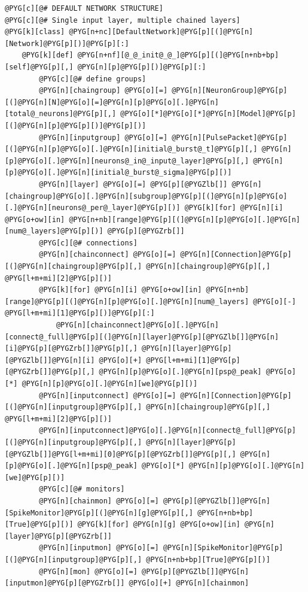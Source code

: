 \documentclass[letterpaper,10pt,english]{manual}
\begin{document}
\begin{Verbatim}[commandchars=@\[\]]
@PYG[c][@# DEFAULT NETWORK STRUCTURE]
@PYG[c][@# Single input layer, multiple chained layers]
@PYG[k][class] @PYG[n+nc][DefaultNetwork]@PYG[p][(]@PYG[n][Network]@PYG[p][)]@PYG[p][:]
    @PYG[k][def] @PYG[n+nf][@_@_init@_@_]@PYG[p][(]@PYG[n+nb+bp][self]@PYG[p][,] @PYG[n][p]@PYG[p][)]@PYG[p][:]
        @PYG[c][@# define groups]
        @PYG[n][chaingroup] @PYG[o][=] @PYG[n][NeuronGroup]@PYG[p][(]@PYG[n][N]@PYG[o][=]@PYG[n][p]@PYG[o][.]@PYG[n][total@_neurons]@PYG[p][,] @PYG[o][*]@PYG[o][*]@PYG[n][Model]@PYG[p][(]@PYG[n][p]@PYG[p][)]@PYG[p][)]
        @PYG[n][inputgroup] @PYG[o][=] @PYG[n][PulsePacket]@PYG[p][(]@PYG[n][p]@PYG[o][.]@PYG[n][initial@_burst@_t]@PYG[p][,] @PYG[n][p]@PYG[o][.]@PYG[n][neurons@_in@_input@_layer]@PYG[p][,] @PYG[n][p]@PYG[o][.]@PYG[n][initial@_burst@_sigma]@PYG[p][)]
        @PYG[n][layer] @PYG[o][=] @PYG[p][@PYGZlb[]] @PYG[n][chaingroup]@PYG[o][.]@PYG[n][subgroup]@PYG[p][(]@PYG[n][p]@PYG[o][.]@PYG[n][neurons@_per@_layer]@PYG[p][)] @PYG[k][for] @PYG[n][i] @PYG[o+ow][in] @PYG[n+nb][range]@PYG[p][(]@PYG[n][p]@PYG[o][.]@PYG[n][num@_layers]@PYG[p][)] @PYG[p][@PYGZrb[]]
        @PYG[c][@# connections]
        @PYG[n][chainconnect] @PYG[o][=] @PYG[n][Connection]@PYG[p][(]@PYG[n][chaingroup]@PYG[p][,] @PYG[n][chaingroup]@PYG[p][,] @PYG[l+m+mi][2]@PYG[p][)]
        @PYG[k][for] @PYG[n][i] @PYG[o+ow][in] @PYG[n+nb][range]@PYG[p][(]@PYG[n][p]@PYG[o][.]@PYG[n][num@_layers] @PYG[o][-] @PYG[l+m+mi][1]@PYG[p][)]@PYG[p][:]
            @PYG[n][chainconnect]@PYG[o][.]@PYG[n][connect@_full]@PYG[p][(]@PYG[n][layer]@PYG[p][@PYGZlb[]]@PYG[n][i]@PYG[p][@PYGZrb[]]@PYG[p][,] @PYG[n][layer]@PYG[p][@PYGZlb[]]@PYG[n][i] @PYG[o][+] @PYG[l+m+mi][1]@PYG[p][@PYGZrb[]]@PYG[p][,] @PYG[n][p]@PYG[o][.]@PYG[n][psp@_peak] @PYG[o][*] @PYG[n][p]@PYG[o][.]@PYG[n][we]@PYG[p][)]
        @PYG[n][inputconnect] @PYG[o][=] @PYG[n][Connection]@PYG[p][(]@PYG[n][inputgroup]@PYG[p][,] @PYG[n][chaingroup]@PYG[p][,] @PYG[l+m+mi][2]@PYG[p][)]
        @PYG[n][inputconnect]@PYG[o][.]@PYG[n][connect@_full]@PYG[p][(]@PYG[n][inputgroup]@PYG[p][,] @PYG[n][layer]@PYG[p][@PYGZlb[]]@PYG[l+m+mi][0]@PYG[p][@PYGZrb[]]@PYG[p][,] @PYG[n][p]@PYG[o][.]@PYG[n][psp@_peak] @PYG[o][*] @PYG[n][p]@PYG[o][.]@PYG[n][we]@PYG[p][)]
        @PYG[c][@# monitors]
        @PYG[n][chainmon] @PYG[o][=] @PYG[p][@PYGZlb[]]@PYG[n][SpikeMonitor]@PYG[p][(]@PYG[n][g]@PYG[p][,] @PYG[n+nb+bp][True]@PYG[p][)] @PYG[k][for] @PYG[n][g] @PYG[o+ow][in] @PYG[n][layer]@PYG[p][@PYGZrb[]]
        @PYG[n][inputmon] @PYG[o][=] @PYG[n][SpikeMonitor]@PYG[p][(]@PYG[n][inputgroup]@PYG[p][,] @PYG[n+nb+bp][True]@PYG[p][)]
        @PYG[n][mon] @PYG[o][=] @PYG[p][@PYGZlb[]]@PYG[n][inputmon]@PYG[p][@PYGZrb[]] @PYG[o][+] @PYG[n][chainmon]

\end{Verbatim}
\end{document}
